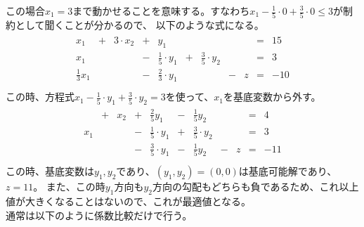 \documentclass[dvipdfmx,titlepage, a4paper]{jsarticle}%
\begin{document}
この場合$x_{1} = 3$まで動かせることを意味する。すなわち$x_{1} - \frac{1}{5}\cdot 0 + \frac{3}{5}\cdot 0 \leq 3$が制約として聞くことが分かるので、
以下のような式になる。
\begin{eqnarray*}
	\begin{array}{lllllllllll}
		x_{1} & + & 3\cdot x_{2} & + & y_{1} &\; & \; &\; & \; & = & 15\\
		x_{1} & \; & \; & - & \frac{1}{5}\cdot y_{1} & + & \frac{3}{5}\cdot y_{2} &\; & \; & = & 3\\
		\frac{1}{3}x_{1} & \; & \; & - & \frac{2}{3}\cdot y_{1} & \;& \; & - & z & = & -10\\
	\end{array}
\end{eqnarray*}
この時、方程式$x_{1} -\frac{1}{5}\cdot y_{1} + \frac{3}{5}\cdot y_{2} = 3$を使って、$x_{1}$を基底変数から外す。
\begin{eqnarray*}
	\begin{array}{lllllllllll}
		\; & + & x_{2} & + & \frac{2}{5}y_{1} & - & \frac{1}{5}y_{2} &\; & \; & = & 4\\
		x_{1} & \; & \; & - & \frac{1}{5}\cdot y_{1} & + & \frac{3}{5}\cdot y_{2} &\; & \; & = & 3\\
		\; & \; & \; & - & \frac{3}{5}\cdot y_{1} & - & \frac{1}{5}y_{2} & - & z & = & -11\\
	\end{array}
\end{eqnarray*}
この時、基底変数は$y_{1}, y_{2}$であり、$(y_{1}, y_{2}) = (0, 0)$は基底可能解であり、$z = 11$。
また、この時$y_{1}$方向も$y_{2}$方向の勾配もどちらも負であるため、これ以上値が大きくなることはないので、これが最適値となる。\\
通常は以下のように係数比較だけで行う。
\end{document}
